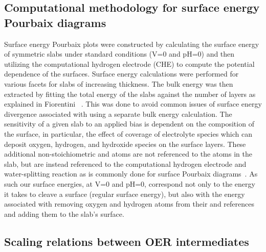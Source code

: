 \subsection{Computational methodology for surface energy Pourbaix diagrams}
%
%
Surface energy Pourbaix plots were constructed by calculating the surface energy of symmetric slabs under standard conditions (\si{\volt}\num{=0} and pH\num{=0}) and then utilizing the computational hydrogen electrode (CHE) to compute the potential dependence of the surfaces.
%
Surface energy calculations were performed for various facets for slabs of increasing thickness.
%
The bulk energy was then extracted by fitting the total energy of the slabs against the number of layers as explained in Fiorentini ~\cite{Boettger1998}.
%
This was done to avoid common issues of surface energy divergence associated with using a separate bulk energy calculation.
%
The sensitivity of a given slab to an applied bias is dependent on the composition of the surface,
in particular, the effect of coverage of electrolyte species which can deposit oxygen, hydrogen, and hydroxide species on the surface layers.
%
These additional non-stoichiometric  and  atoms are not referenced to the atoms in the slab,
but are instead referenced to the computational hydrogen electrode and water-splitting reaction as is commonly done for surface Pourbaix diagrams~\cite{Lu2017}.
%
As such our surface energies,
at \si{\volt}\num{=0} and pH\num{=0},
correspond not only to the energy it takes to cleave a surface (regular surface energy),
but also with the energy associated with removing oxygen and hydrogen atoms from their  and  references and adding them to the slab's surface.

\subsection{Scaling relations between OER intermediates}
%

